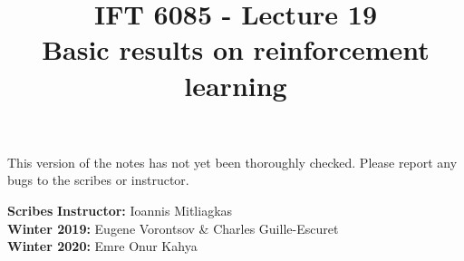 \documentclass{article}
\title{IFT 6085 - Lecture 19 \\ 
Basic results on reinforcement learning}
\date{}
\begin{document}
 

\maketitle

\vspace{-0.5in}
\begin{center}
This version of the notes has not yet been thoroughly checked.
Please report any bugs to the scribes or instructor.
\end{center}
\vspace{0.2in}

\textbf{Scribes}\hfill
\textbf{Instructor:}  Ioannis Mitliagkas\\
\textbf{Winter 2019:} Eugene Vorontsov \& Charles Guille-Escuret\\
\textbf{Winter 2020:} Emre Onur Kahya\\



\newcommand{\infgc}{\inf_{g \in \mathcal{C}}}
\newcommand{\supgc}{\sup_{g \in \mathcal{C}}}

\newcommand{\Prob}{\mathbb{P}}
\newcommand{\E}{\mathbb{E}}
\newcommand{\reals}{\mathbb{R}}



\end{document}
